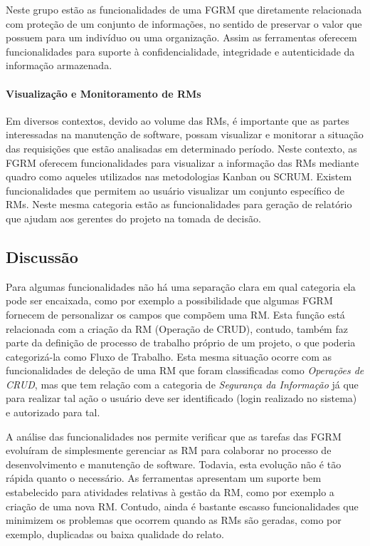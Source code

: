 Neste grupo estão as funcionalidades de uma FGRM que diretamente relacionada com
proteção de um conjunto de informações, no sentido de preservar o valor que
possuem para um indivíduo ou uma organização. Assim as ferramentas oferecem
funcionalidades para suporte à confidencialidade, integridade e autenticidade da
informação armazenada.

\paragraph{Visualização e Monitoramento de RMs}
\label{par:visualização_de_rm_s}

Em diversos contextos, devido ao volume das RMs, é importante que as partes
interessadas na manutenção de software, possam visualizar e monitorar a situação
das requisições que estão analisadas em determinado período. Neste contexto, as
FGRM oferecem funcionalidades para visualizar a informação das RMs mediante
quadro como aqueles utilizados nas metodologias Kanban ou SCRUM\@. Existem
funcionalidades que permitem ao usuário visualizar um conjunto específico de
RMs. Neste mesma categoria estão as funcionalidades para geração de relatório
que ajudam aos gerentes do projeto na tomada de decisão.

\subsection{Discussão}
\label{sec:discussao}

Para algumas funcionalidades não há uma separação clara em qual categoria ela
pode ser encaixada, como por exemplo a possibilidade que algumas FGRM fornecem
de personalizar os campos que compõem uma RM\@. Esta função está relacionada com
a criação da RM (Operação de CRUD), contudo, também faz parte da definição de
processo de trabalho próprio de um projeto, o que poderia categorizá-la como
Fluxo de Trabalho. Esta mesma situação ocorre com as funcionalidades de deleção
de uma RM que foram classificadas como \textit{Operações de CRUD}, mas que tem
relação com a categoria de \textit{Segurança da Informação} já que para realizar
tal ação o usuário deve ser identificado (login realizado no sistema) e
autorizado para tal.

A análise das funcionalidades nos permite verificar que as tarefas das FGRM
evoluíram de simplesmente gerenciar as RM para colaborar no processo de
desenvolvimento e manutenção de software. Todavia, esta evolução não é tão
rápida quanto o necessário. As ferramentas apresentam um suporte bem
estabelecido para atividades relativas à gestão da RM, como por exemplo a
criação de uma nova RM\@. Contudo, ainda é bastante escasso funcionalidades que
minimizem os problemas que ocorrem quando as RMs são geradas, como por exemplo,
duplicadas ou baixa qualidade do relato.

